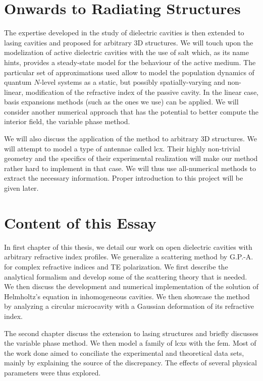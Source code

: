 \section{Onwards to Radiating Structures}
The expertise developed in the study of dielectric cavities is then
extended to lasing cavities and proposed for arbitrary
3D structures. We will touch upon the modelization of active
dielectric cavities with the use of \gls{salt} which, as its name
hints, provides a steady-state model for the behaviour of the 
active medium. The particular set of approximations used 
allow to model the population dynamics of quantum $N$-level
systems as a static, but possibly spatially-varying and non-linear, 
modification of the refractive index of the passive cavity. 
In the linear case, basis expansions methods (such as the ones
we use) can be applied. We will consider another numerical approach
that has the potential to better compute the interior field, the
variable phase method. 

We will also discuss the application of the method to arbitrary 
3D structures. We will attempt to model a type of antennae 
called \gls{lcx}. Their highly non-trivial geometry and the specifics
of their experimental realization will make our method rather hard 
to implement in that case. We will thus use all-numerical methods 
to extract the necessary information. Proper introduction to this project
will be given later.

\section{Content of this Essay}

In first chapter of this thesis, we detail our work on open
dielectric cavities with arbitrary refractive index profiles. 
We generalize a scattering method by G.P.-A. \cite{GAP2013a} for 
complex refractive indices and TE polarization. We first describe
the analytical formalism and develop some of the scattering theory 
that is needed. We then discuss the development and numerical implementation
of the solution of Helmholtz's equation in inhomogeneous cavities. 
We then showcase the method by analyzing a circular microcavity with a 
Gaussian deformation of its refractive index. 

The second chapter discuss the extension to lasing structures and briefly
discusses the variable phase method. We then model a family of \glspl{lcx}
with the \gls{fem}. Most of the work done aimed to conciliate the 
experimental and theoretical data sets, mainly by explaining the source
of the discrepancy. The effects of several physical parameters were thus explored. 

